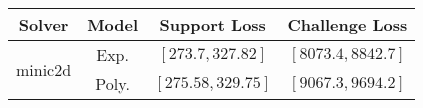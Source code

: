 \begin{tabular}{cc|c|c} 
\hline 
 Solver & Model & Support Loss  & Challenge Loss \tabularnewline\hline 
\hline 
\multirow{2}{*}{minic2d} & Exp. & $\mathbf{\left[273.7,327.82\right]}$ & $\mathbf{\left[8073.4,8842.7\right]}$ \tabularnewline 
 & Poly. & $\left[275.58,329.75\right]$ & $\left[9067.3,9694.2\right]$ \tabularnewline 
\hline 
\end{tabular} 

